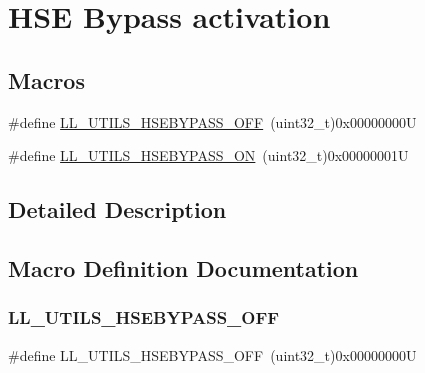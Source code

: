 \hypertarget{group___u_t_i_l_s___e_c___h_s_e___b_y_p_a_s_s}{}\section{H\+SE Bypass activation}
\label{group___u_t_i_l_s___e_c___h_s_e___b_y_p_a_s_s}
\subsection*{Macros}
\begin{DoxyCompactItemize}
\item 
\#define \hyperlink{group___u_t_i_l_s___e_c___h_s_e___b_y_p_a_s_s_ga4aab0968739934c6560805bcf222e1fe}{L\+L\+\_\+\+U\+T\+I\+L\+S\+\_\+\+H\+S\+E\+B\+Y\+P\+A\+S\+S\+\_\+\+O\+FF}~(uint32\+\_\+t)0x00000000U
\item 
\#define \hyperlink{group___u_t_i_l_s___e_c___h_s_e___b_y_p_a_s_s_ga2053b398a3829ad616af6f1a732dbdd4}{L\+L\+\_\+\+U\+T\+I\+L\+S\+\_\+\+H\+S\+E\+B\+Y\+P\+A\+S\+S\+\_\+\+ON}~(uint32\+\_\+t)0x00000001U
\end{DoxyCompactItemize}


\subsection{Detailed Description}


\subsection{Macro Definition Documentation}
\mbox{\label{group___u_t_i_l_s___e_c___h_s_e___b_y_p_a_s_s_ga4aab0968739934c6560805bcf222e1fe}} 
\subsubsection{\texorpdfstring{L\+L\+\_\+\+U\+T\+I\+L\+S\+\_\+\+H\+S\+E\+B\+Y\+P\+A\+S\+S\+\_\+\+O\+FF}{LL\_UTILS\_HSEBYPASS\_OFF}}
{\footnotesize\ttfamily \#define L\+L\+\_\+\+U\+T\+I\+L\+S\+\_\+\+H\+S\+E\+B\+Y\+P\+A\+S\+S\+\_\+\+O\+FF~(uint32\+\_\+t)0x00000000U}

